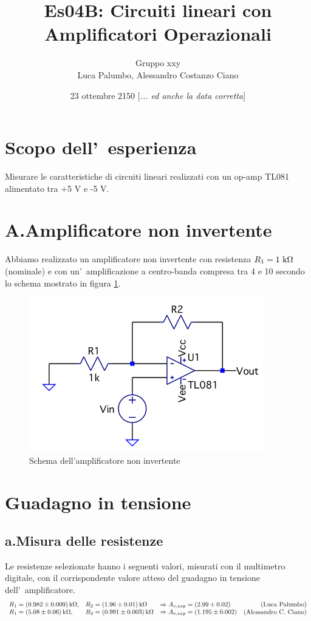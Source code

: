 \documentclass[10pt,a4paper]{article}
\author{Gruppo xxy \\ Luca Palumbo, Alessandro Costanzo Ciano \rem{non dimenticate di inserire i vostri nomi...}}
\title{Es04B: Circuiti lineari con Amplificatori Operazionali}
\newcommand{\rem}[1]{[\emph{#1}]}
\begin{document}
\date{23 ottembre 2150 \rem{... ed anche la data corretta}}
\maketitle


\section*{Scopo dell'~esperienza}
Misurare le caratteristiche di circuiti lineari realizzati con un op-amp TL081 alimentato tra +5 V e -5 V.

\section*{A.Amplificatore non invertente}
Abbiamo realizzato un amplificatore non invertente con resistenza $R_1= 1 \rm \ k\Omega$  (nominale)
e con un'~amplificazione a centro-banda compresa tra 4 e 10 secondo lo schema mostrato in figura \ref{fig:noninv}.
%
\begin{figure}[h]
\begin{center}
\includegraphics[width=0.4\linewidth]{ampl-noninv.png}
\caption{\small Schema dell'amplificatore non invertente}
\label{fig:noninv}
\end{center}
\end{figure}
%

\section{Guadagno in tensione}
\subsection*{a.Misura delle resistenze}
Le resistenze selezionate hanno i seguenti valori, misurati con il multimetro digitale, con il corrispondente valore atteso 
del guadagno in tensione dell'~amplificatore.
\[
\begin{array}{l l l r}
    R_1 = ( 0.982 \pm 0.009) \,\mathrm{k}\Omega, & R_2 = (1.96 \pm 0.01) \,\mathrm{k}\Omega & \Rightarrow A_{v,exp} = ( 2.99 \pm 0.02) & \mbox{(Luca Palumbo)}\\
    R_1 = ( 5.08 \pm 0.06) \,\mathrm{k}\Omega, & R_2 = (0.991 \pm 0.003) \,\mathrm{k}\Omega & \Rightarrow A_{v,exp} = ( 1.195 \pm 0.002) & \mbox{(Alessandro C. Ciano)}
\end{array}
\]
\end{document}
